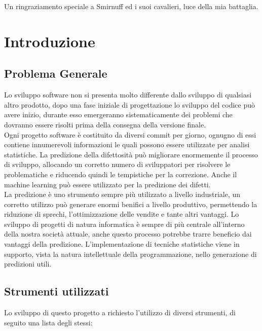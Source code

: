 \documentclass[%
    corpo=12pt,
    twoside,
    oldstyle,
    autoretitolo,
    greek,
    evenboxes,
]{toptesi}
\begin{document}
\acknowledgements
Un ringraziamento speciale a Smirnuff ed i suoi cavalieri, luce della mia battaglia.

\indici

\mainmatter


\chapter{Introduzione}
\label{chap:intro}
\section{Problema Generale}
Lo sviluppo software non si presenta molto differente dallo sviluppo di qualsiasi altro prodotto, dopo una fase iniziale di progettazione lo sviluppo del codice può avere inizio, durante esso emergeranno sistematicamente dei problemi che dovranno essere risolti prima della consegna della versione finale.\\
Ogni progetto software è costituito da diversi commit per giorno, ognugno di essi contiene innumerevoli informazioni le quali possono essere utilizzate per analisi statistiche. La predizione della difettosità può migliorare enormemente il processo di sviluppo, allocando un corretto numero di sviluppatori per risolvere le problematiche e riducendo quindi le tempistiche per la correzione. Anche il machine learning può essere utilizzato per la predizione dei difetti.\\
La predizione è uno strumento sempre più utilizzato a livello industriale, un corretto utilizzo può generare enormi benifici a livello produttivo, permettendo la riduzione di sprechi, l'ottimizzazione delle vendite e tante altri vantaggi. Lo sviluppo di progetti di natura informatica è sempre di più centrale all'interno della nostra società attuale, anche questo processo potrebbe trarre beneficio dai vantaggi della predizione. L'implementazione di tecniche statistiche viene in supporto, vista la natura intellettuale della programmazione, nello generazione di predizioni utili.

\section{Strumenti utilizzati}
Lo sviluppo di questo progetto a richiesto l'utilizzo di diversi strumenti, di seguito una lista degli stessi:
\end{document}

